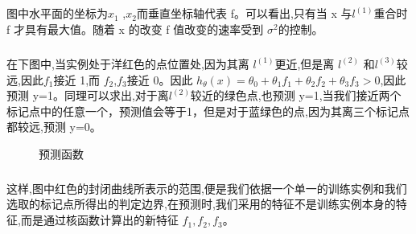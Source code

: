 \documentclass{article}
\begin{document}
\begin{CJK}{UTF8}{gbsn}
\subparagraph{}
图中水平面的坐标为$x_1$ ,$x_2$而垂直坐标轴代表 f。可以看出,只有当 x 与$l^{(1)}$重合时 f 才具有最大值。随着 x 的改变 f 值改变的速率受到 $\sigma^2$的控制。
\begin{figure}[H]
\label{fig:734}
\end{figure}
\begin{figure}[H]
\label{fig:735}
\end{figure}
\begin{figure}[H]
\label{fig:736}
\end{figure}
\begin{figure}[H]
\label{fig:737}
\end{figure}
\begin{figure}[H]
\label{fig:738}
\end{figure}
\begin{figure}[H]
\label{fig:739}
\end{figure}
\subparagraph{}
在下图中,当实例处于洋红色的点位置处,因为其离 $l^{(1)}$更近,但是离 $l^{(2)}$ 和$l^{(3)}$较远,因此$f_1$接近 1,而 $f_2$,$f_3$接近 0。因此 $h_\theta(x)=\theta_0+\theta_1f_1+\theta_2f_2+\theta_3f_3>0$,因此预测 y=1。同理可以求出,对于离$l^{(2)}$较近的绿色点,也预测 y=1,当我们接近两个标记点中的任意一个，预测值会等于1，但是对于蓝绿色的点,因为其离三个标记点都较远,预测 y=0。
\begin{figure}[H]
\label{fig:740}
\caption{预测函数}
\end{figure}
\subparagraph{}
这样,图中红色的封闭曲线所表示的范围,便是我们依据一个单一的训练实例和我们选取的标记点所得出的判定边界,在预测时,我们采用的特征不是训练实例本身的特征,而是通过核函数计算出的新特征 $f_1,f_2,f_3$。

\end{CJK}
\end{document}

